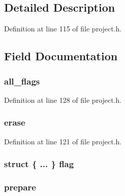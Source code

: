 \subsection{\-Detailed \-Description}


\-Definition at line 115 of file project.\-h.



\subsection{\-Field \-Documentation}
\hypertarget{unions__message__flags_abf876e68df8575f02084e137cc49266b}{
\subsubsection[{all\-\_\-flags}]{ {\bf all\-\_\-flags}}}\label{unions__message__flags_abf876e68df8575f02084e137cc49266b}


\-Definition at line 128 of file project.\-h.

\hypertarget{unions__message__flags_ada1ae3495f53243e7b5e0c42b23ea23e}{
\subsubsection[{erase}]{ {\bf erase}}}\label{unions__message__flags_ada1ae3495f53243e7b5e0c42b23ea23e}


\-Definition at line 121 of file project.\-h.

\hypertarget{unions__message__flags_afab2973bf2fba71ed2d5fced86bc2598}{
\subsubsection[{flag}]{\setlength{\rightskip}{0pt plus 5cm}struct \{ ... \}   {\bf flag}}}\label{unions__message__flags_afab2973bf2fba71ed2d5fced86bc2598}
\hypertarget{unions__message__flags_ac9fd816d2574fa72f3fbde01b771ed61}{
\subsubsection[{prepare}]{ {\bf prepare}}}\label{unions__message__flags_ac9fd816d2574fa72f3fbde01b771ed61}


